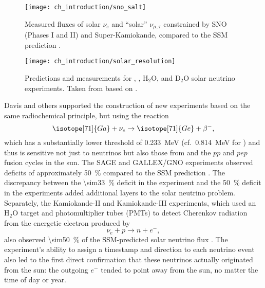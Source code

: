 \begin{figure}
    \centering
    \texttt{[image: ch\_introduction/sno\_salt]}
    \caption[SNO observation of $\phi_e$ vs. $\phi_{\mu,\tau}$]{
        Measured fluxes of solar $\nu_e$ and ``solar'' $\nu_{\mu,\tau}$
        constrained by SNO (Phases I and II) and Super-Kamiokande,
        compared to the SSM prediction \cite{sno_salt2004}.
    }
    \label{fig:sno_plots}
\end{figure}

\begin{figure}
    \centering
    \texttt{[image: ch\_introduction/solar\_resolution]}
    \caption[Solar neutrino flux  measurements]{
        Predictions and measurements for , ,
        $\text{H}_2\text{O}$, and $\text{D}_2\text{O}$ solar neutrino experiments.
        Taken from \cite{bahcall_images} based on \cite{bahcall2005_diagram}.
    }
    \label{fig:solar_neutrino_fixed}
\end{figure}

Davis and others supported the construction of
new experiments based on the same radiochemical principle,
but using the reaction
\begin{equation}\label{eq:gallium}
    \isotope[71]{Ga} + \nu_e \to \isotope[71]{Ge} + \beta^-,
\end{equation}
which has a substantially lower threshold
of \SI{0.233}{\MeV} (cf.\ \SI{0.814}{\MeV} for )
and thus is sensitive not just to  neutrinos
but also those from  and the $pp$ and $pep$ fusion cycles in the sun.
The SAGE and GALLEX/GNO experiments observed deficits of approximately \SI{50}{\percent}
compared to the SSM prediction \cite{sage,gallex}.
The discrepancy between the \SI{\sim33}{\percent} deficit
in the  experiment
and the \SI{50}{\percent} deficit in the  experiments
added additional layers to the solar neutrino problem.
Separately, the Kamiokande-II and Kamiokande-III experiments,
which used an $\text{H}_2\text{O}$ target
and photomultiplier tubes (PMTs)
to detect Cherenkov radiation from the energetic electron produced by
\begin{equation}\label{eq:kamiokande}
    \nu_e + p \to n + e^-,
\end{equation}
also observed \SI{\sim50}{\percent} of the SSM-predicted solar neutrino flux
\cite{kamiokande_III}.
The experiment's ability to assign a timestamp and direction to each neutrino event
also led to the first direct confirmation that these neutrinos
actually originated from the sun:
the outgoing $e^-$ tended to point away from the sun,
no matter the time of day or year.

